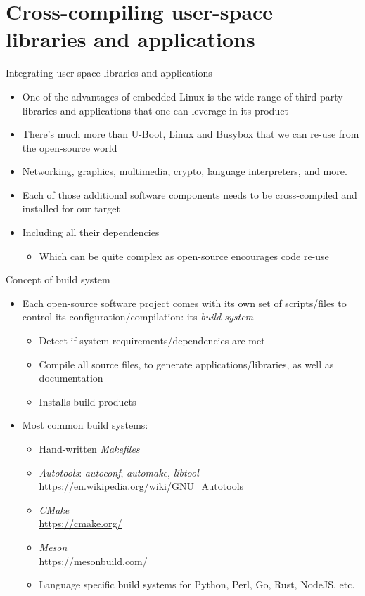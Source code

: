 \section[CROSS]{Cross-compiling user-space libraries and applications}

\begin{frame}{Integrating user-space libraries and applications}
  \begin{itemize}
  \item One of the advantages of embedded Linux is the wide range of
    third-party libraries and applications that one can leverage in
    its product
  \item There's much more than U-Boot, Linux and Busybox that we can
    re-use from the open-source world
  \item Networking, graphics, multimedia, crypto, language
    interpreters, and more.
  \item Each of those additional software components needs to be
    cross-compiled and installed for our target
  \item Including all their dependencies
    \begin{itemize}
    \item Which can be quite complex as open-source encourages code
      re-use
    \end{itemize}
  \end{itemize}
\end{frame}

\begin{frame}{Concept of build system}
  \begin{itemize}
  \item Each open-source software project comes with its own set of
    scripts/files to control its configuration/compilation: its {\em
      build system}
    \begin{itemize}
    \item Detect if system requirements/dependencies are met
    \item Compile all source files, to generate
      applications/libraries, as well as documentation
    \item Installs build products
    \end{itemize}
  \item Most common build systems:
    \begin{itemize}
    \item Hand-written {\em Makefiles}
    \item {\em Autotools}: {\em autoconf}, {\em automake}, {\em libtool}\\
      \url{https://en.wikipedia.org/wiki/GNU_Autotools}
    \item {\em CMake}\\
      \url{https://cmake.org/}
    \item {\em Meson}\\
      \url{https://mesonbuild.com/}
    \item Language specific build systems for Python, Perl, Go, Rust,
      NodeJS, etc.
    \end{itemize}
  \end{itemize}
\end{frame}

